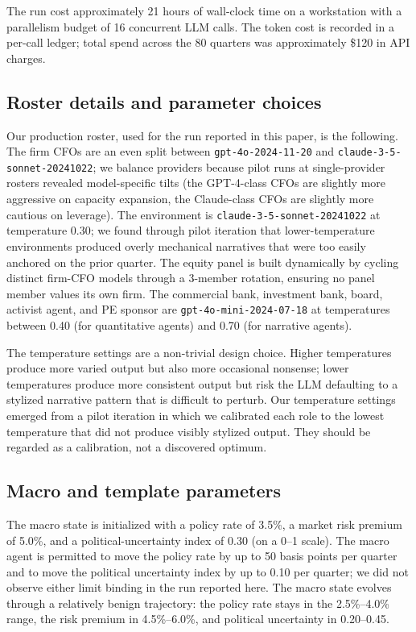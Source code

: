 \documentclass[11pt]{article}
\begin{document}
The run cost approximately 21 hours of wall-clock time on a workstation
with a parallelism budget of 16 concurrent LLM calls. The token cost is
recorded in a per-call ledger; total spend across the 80 quarters was
approximately \$120 in API charges.

\subsection{Roster details and parameter choices}

Our production roster, used for the run reported in this paper, is the
following. The firm CFOs are an even split between
\texttt{gpt-4o-2024-11-20} and \texttt{claude-3-5-sonnet-20241022}; we
balance providers because pilot runs at single-provider rosters
revealed model-specific tilts (the GPT-4-class CFOs are slightly more
aggressive on capacity expansion, the Claude-class CFOs are slightly
more cautious on leverage). The environment is
\texttt{claude-3-5-sonnet-20241022} at temperature 0.30; we found
through pilot iteration that lower-temperature environments produced
overly mechanical narratives that were too easily anchored on the
prior quarter. The equity panel is built dynamically by cycling
distinct firm-CFO models through a 3-member rotation, ensuring no
panel member values its own firm. The commercial bank, investment
bank, board, activist agent, and PE sponsor are
\texttt{gpt-4o-mini-2024-07-18} at temperatures between 0.40 (for
quantitative agents) and 0.70 (for narrative agents).

The temperature settings are a non-trivial design choice. Higher
temperatures produce more varied output but also more occasional
nonsense; lower temperatures produce more consistent output but risk
the LLM defaulting to a stylized narrative pattern that is difficult
to perturb. Our temperature settings emerged from a pilot iteration
in which we calibrated each role to the lowest temperature that did
not produce visibly stylized output. They should be regarded as a
calibration, not a discovered optimum.

\subsection{Macro and template parameters}

The macro state is initialized with a policy rate of 3.5\%, a market
risk premium of 5.0\%, and a political-uncertainty index of 0.30
(on a 0--1 scale). The macro agent is permitted to move the policy
rate by up to 50 basis points per quarter and to move the political
uncertainty index by up to 0.10 per quarter; we did not observe
either limit binding in the run reported here. The macro state
evolves through a relatively benign trajectory: the policy rate
stays in the 2.5\%--4.0\% range, the risk premium in 4.5\%--6.0\%, and
political uncertainty in 0.20--0.45.
\end{document}
